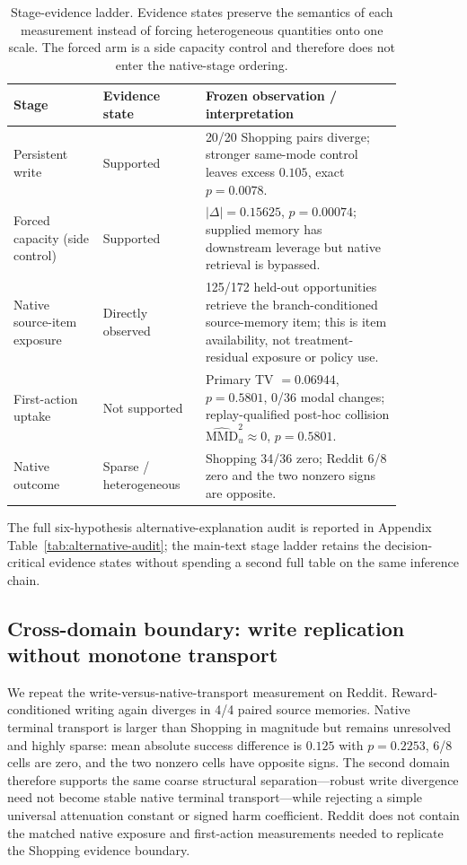 \begin{table}[t]
\centering
\small
\caption{Stage-evidence ladder. Evidence states preserve the semantics of each measurement instead of forcing heterogeneous quantities onto one scale. The forced arm is a side capacity control and therefore does not enter the native-stage ordering.}
\label{tab:evidence-ladder}
\begin{tabular}{@{}p{0.20\linewidth}p{0.22\linewidth}p{0.44\linewidth}@{}}
\toprule
Stage & Evidence state & Frozen observation / interpretation \\
\midrule
Persistent write & Supported & 20/20 Shopping pairs diverge; stronger same-mode control leaves excess $0.105$, exact $p=0.0078$. \\
Forced capacity (side control) & Supported & $|\Delta|=0.15625$, $p=0.00074$; supplied memory has downstream leverage but native retrieval is bypassed. \\
Native source-item exposure & Directly observed & 125/172 held-out opportunities retrieve the branch-conditioned source-memory item; this is item availability, not treatment-residual exposure or policy use. \\
First-action uptake & Not supported & Primary TV $=0.06944$, $p=0.5801$, 0/36 modal changes; replay-qualified post-hoc collision $\widehat{\mathrm{MMD}}^2_u\approx0$, $p=0.5801$. \\
Native outcome & Sparse / heterogeneous & Shopping 34/36 zero; Reddit 6/8 zero and the two nonzero signs are opposite. \\
\bottomrule
\end{tabular}
\end{table}

The full six-hypothesis alternative-explanation audit is reported in Appendix Table~\ref{tab:alternative-audit}; the main-text stage ladder retains the decision-critical evidence states without spending a second full table on the same inference chain.

\subsection{Cross-domain boundary: write replication without monotone transport}
We repeat the write-versus-native-transport measurement on Reddit. Reward-conditioned writing again diverges in 4/4 paired source memories. Native terminal transport is larger than Shopping in magnitude but remains unresolved and highly sparse: mean absolute success difference is $0.125$ with $p=0.2253$, 6/8 cells are zero, and the two nonzero cells have opposite signs. The second domain therefore supports the same coarse structural separation---robust write divergence need not become stable native terminal transport---while rejecting a simple universal attenuation constant or signed harm coefficient. Reddit does not contain the matched native exposure and first-action measurements needed to replicate the Shopping evidence boundary.


